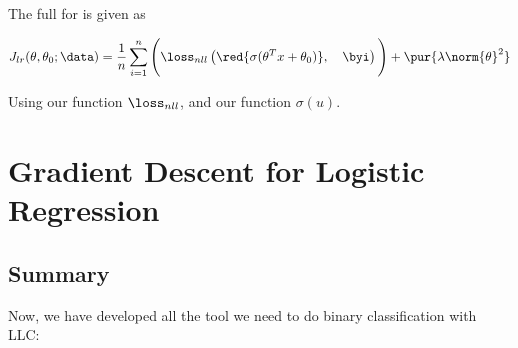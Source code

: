         \begin{kequation}
            The full  for  is given as
            
            \begin{equation*}
                J_{lr}(\theta,\theta_0;\data)
                =
                \frac{1}{n}
                \sum_{i=1}^n 
                \Bigg(
                    \loss_{nll}
                    \left(
                        \red{\sigma(\theta^T x + \theta_0)} ,\quad \byi
                    \right)
                \Bigg)
                +
                \pur{ \lambda \norm{\theta}^2 }
            \end{equation*}
            
            Using our  function $\loss_{nll}$, and our  function $\sigma(u)$.
            
        \end{kequation}

\pagebreak

\section{Gradient Descent for Logistic Regression}

    \subsection{Summary}
    
    Now, we have developed all the tool we need to do binary classification with LLC:
    
